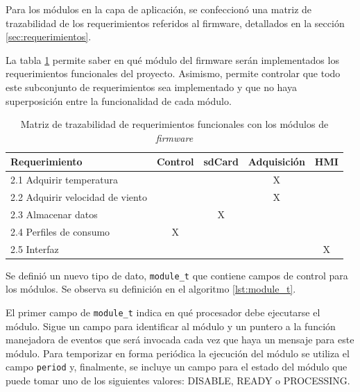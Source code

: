 \vspace{10px}

Para los módulos en la capa de aplicación, se confeccionó una matriz de trazabilidad de los requerimientos referidos al firmware, detallados en la sección \ref{sec:requerimientos}.

La tabla \ref{tab:trazabilidad} permite saber en qué módulo del firmware serán implementados los requerimientos funcionales del proyecto.  Asimismo, permite controlar que todo este subconjunto de requerimientos sea implementado y que no haya superposición entre la funcionalidad de cada módulo.

\vspace{5px}

\begin{table}[ht]
\centering
\caption[Matriz de trazabilidad de requerimientos funcionales]{Matriz de trazabilidad de requerimientos funcionales con los módulos de \textit{firmware}}
\label{tab:trazabilidad}
\begin{tabular}{lcccc}
\toprule
\textbf{Requerimiento} & \textbf{Control} & \textbf{sdCard} & \textbf{Adquisición} & \textbf{HMI} \\ \midrule
2.1 Adquirir temperatura                   &                  &                 & X                    &              \\ %
2.2 Adquirir velocidad de viento           &                  &                 & X                    &              \\ %
2.3 Almacenar datos                        &                  & X               &                      &              \\ %
2.4 Perfiles de consumo                    & X                &                 &                      &              \\ %
2.5 Interfaz                               &                  &                 &                      & X            \\ \bottomrule
\end{tabular}
\end{table}

Se definió un nuevo tipo de dato, \texttt{module\_t} que contiene campos de control para los módulos. Se observa su definición en el algoritmo \ref{lst:module_t}.

El primer campo de \texttt{module\_t} indica en qué procesador debe ejecutarse el módulo. Sigue un campo para identificar al módulo y un puntero a la función manejadora de eventos que será invocada cada vez que haya un mensaje para este módulo. Para temporizar en forma periódica la ejecución del módulo se utiliza el campo \texttt{period} y, finalmente, se incluye un campo para el estado del módulo que puede tomar uno de los siguientes valores: DISABLE, READY o PROCESSING.

